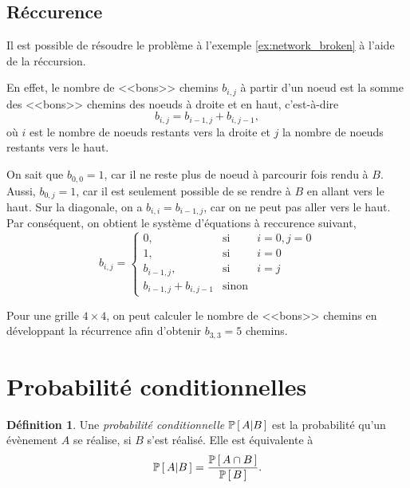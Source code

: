 \documentclass[11pt]{article}
\makeatletter
\renewcommand\P[1]{%
	\ensuremath{%
		\mathbb{P}\left[\,#1\,\right]%
	}%
}%
\newcommand\Pg[2]{%
	\ensuremath{%
		\mathbb{P}\left[\,#1\middle\rvert#2\,\right]%
	}%
}%
\theoremstyle{remark}
\theoremstyle{definition}
\newtheorem*{@definition}{Définition}
\newenvironment{definition}{%
	\begin{@definition}%
}{%
	\end{@definition}%
	\setcounter{property}{0}%
}
\makeatother
\begin{document}
\subsection{Réccurence}
\begin{exemple}
	Il est possible de résoudre le problème à l'exemple \ref{ex:network_broken}
	à l'aide de la réccursion.
	
	En effet, le nombre de <<bons>> chemins $b_{i,j}$ à partir d'un noeud est
	la somme des <<bons>> chemins des noeuds à droite et en haut, c'est-à-dire
	\begin{equation*}
		b_{i,j}=b_{i-1,j}+b_{i,j-1},
	\end{equation*}
	où $i$ est le nombre de noeuds restants vers la droite et $j$ la nombre de
	noeuds restants vers le haut.

	On sait que $b_{0,0}=1$, car il ne reste plus de noeud à parcourir fois
	rendu à $B$. Aussi, $b_{0,j}=1$, car il est seulement possible de se rendre
	à $B$ en allant vers le haut. Sur la diagonale, on a $b_{i,i}=b_{i-1,j}$,
	car on ne peut pas aller vers le haut. Par conséquent, on obtient le
	système d'équations à reccurence suivant,
	\begin{equation*}
		b_{i,j}=\left\{
			\begin{matrix}
				0,                 &\text{si}&i=0,j=0\\
				1,                 &\text{si}&i=0\\
				b_{i-1,j},         &\text{si}&i=j\\
				b_{i-1,j}+b_{i,j-1}&\text{sinon}
			\end{matrix}
		\right.
	\end{equation*}

	Pour une grille $4\times 4$, on peut calculer le nombre de <<bons>> chemins
	en développant la récurrence afin d'obtenir $b_{3,3}=5$ chemins.
\end{exemple}

\section{Probabilité conditionnelles}
\begin{definition}
	Une \textit{probabilité conditionnelle} $\Pg{A}{B}$ est la probabilité
	qu'un évènement $A$ se réalise, si $B$ s'est réalisé. Elle est équivalente
	à
	\begin{equation*}
		\Pg{A}{B}=\frac{\P{A\cap B}}{\P{B}}.
	\end{equation*}
\end{definition}
\end{document}
